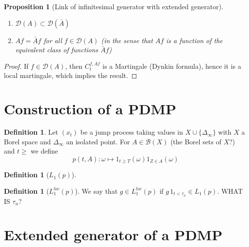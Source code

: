 \documentclass[11pt]{amsart}
\newtheorem{proposition}[theorem]{Proposition}
\theoremstyle{definition}
\newtheorem{definition}[theorem]{Definition}
\theoremstyle{remark}
\newcommand{\depends}[1]{}
\newcommand{\extgen}{\bar{A}}
\begin{document}
\begin{proposition}[Link of infinitesimal generator with extended generator]\label{prop:link-gen-ext-gen}
\depends{def:ext-gen}
\begin{enumerate}
	\item $\mathcal{D}(A) \subset \mathcal{D}(\extgen)$
	\item $Af = \extgen f$ for all $f \in \mathcal{D}(A)$ (in the sense that $Af$ is a function of the equivalent class of functions $\extgen f$)
\end{enumerate}
\end{proposition}
\begin{proof}
If $f \in \mathcal{D}(A)$, then $C_t^{f,Af}$ is a Martingale (Dynkin formula), hence it is a local martingale, which implies the result.
\end{proof}

\section{Construction of a PDMP}\label{sec:constr-pdmp}

\begin{definition}\label{def:point-process-p}
Let $(x_t)$ be a jump process  taking values in $X \cup \{\Delta_\infty\}$ with $X$ a Borel space and $\Delta_\infty$ an isolated point. For $A \in \mathcal{B}(X)$ (the Borel sets of $X$?) and $t \geq $ we define
\[
	p(t,A): \omega \mapsto 1_{t \geq T}(\omega) 1_{Z\in A}(\omega)
\]
\end{definition}

\begin{definition}[$L_1(p)$]\label{def:L1-p}

\end{definition}

\begin{definition}[$L_1^{loc}(p)$]\label{def:L1-loc-p}
We say that $g \in L_1^{loc}(p)$ if $g \, 1_{t < \tau_n} \in L_1(p)$. WHAT IS $\tau_n$?
\end{definition}


\section{Extended generator of a PDMP}\label{sec:ext-gen-pdmp}
\end{document}
